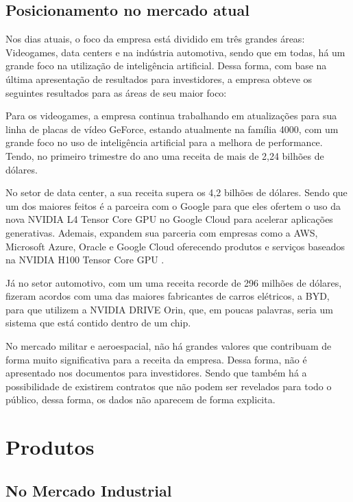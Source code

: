 \documentclass[conference]{IEEEtran}
\begin{document}
\subsection{Posicionamento no mercado atual}
\par Nos dias atuais, o foco da empresa está dividido em três grandes áreas: Videogames, data centers e na indústria automotiva, sendo que em todas, há um grande foco na utilização de inteligência artificial. Dessa forma, com base na última apresentação de resultados para investidores, a empresa obteve os seguintes resultados para as áreas de seu maior foco:
\par Para os videogames, a empresa continua trabalhando em atualizações para sua linha de placas de vídeo GeForce, estando atualmente na família 4000, com um grande foco no uso de inteligência artificial para a melhora de performance. Tendo, no primeiro trimestre do ano uma receita de mais de 2,24 bilhões de dólares.
\par No setor de data center, a sua receita supera os 4,2 bilhões de dólares. Sendo que um dos maiores feitos é a parceira com o Google para que eles ofertem o uso da nova NVIDIA L4 Tensor Core GPU no Google Cloud para acelerar aplicações generativas. Ademais, expandem sua parceria com empresas como a AWS, Microsoft Azure, Oracle e Google Cloud oferecendo produtos e serviços baseados na NVIDIA H100 Tensor Core GPU .
\par Já no setor automotivo, com um uma receita recorde de 296 milhões de dólares, fizeram acordos com uma das maiores fabricantes de carros elétricos, a BYD, para que utilizem a NVIDIA DRIVE Orin, que, em poucas palavras, seria um sistema que está contido dentro de um chip.
\par No mercado militar e aeroespacial, não há grandes valores que contribuam de forma muito significativa para a receita da empresa. Dessa forma, não é apresentado nos documentos para investidores. Sendo que também há a possibilidade de existirem contratos que não podem ser revelados para todo o público, dessa forma, os dados não aparecem de forma explicita. 

\section{Produtos}
\subsection{No Mercado Industrial}
\end{document}
